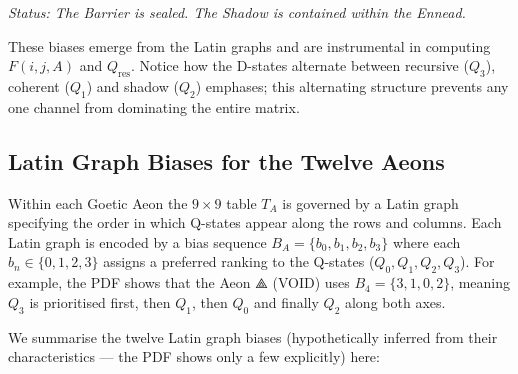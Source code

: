 \documentclass[11pt, letterpaper]{article}
\begin{document}
\vspace{1em}
\noindent \textit{Status: The Barrier is sealed. The Shadow is contained within the Ennead.}

These biases emerge from the Latin graphs and are instrumental in computing $F(i,j,A)$ and $Q_{\text{res}}$. Notice how the D-states alternate between recursive ($Q_3$), coherent ($Q_1$) and shadow ($Q_2$) emphases; this alternating structure prevents any one channel from dominating the entire matrix.

\subsection{Latin Graph Biases for the Twelve Aeons}\label{sec:8.8}

Within each Goetic Aeon the $9 \times 9$ table $T_A$ is governed by a Latin graph specifying the order in which Q-states appear along the rows and columns. Each Latin graph is encoded by a bias sequence $B_A = \{b_0, b_1, b_2, b_3\}$ where each $b_n \in \{0,1,2,3\}$ assigns a preferred ranking to the Q-states ($Q_0, Q_1, Q_2, Q_3$). For example, the PDF shows that the Aeon \ensuremath{\mathbin{⟁}} (VOID) uses $B_4 = \{3,1,0,2\}$, meaning $Q_3$ is prioritised first, then $Q_1$, then $Q_0$ and finally $Q_2$ along both axes.

We summarise the twelve Latin graph biases (hypothetically inferred from their characteristics --- the PDF shows only a few explicitly) here:
\end{document}
